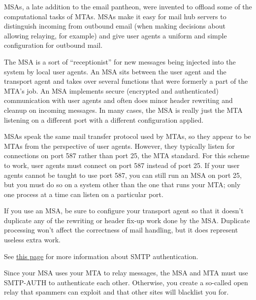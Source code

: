 \protect\hypertarget{part0026_split_003.htmlux5cux23_idIndexMarker2403}{}{}\protect\hypertarget{part0026_split_003.htmlux5cux23_idIndexMarker2404}{}{}\protect\hypertarget{part0026_split_003.htmlux5cux23_idIndexMarker2405}{}{}MSAs,
a late addition to the email pantheon, were invented to offload some of
the computational tasks of MTAs. MSAs make it easy for mail hub servers
to distinguish incoming from outbound email (when making decisions about
allowing relaying, for example) and give user agents a uniform and
simple configuration for outbound mail.

The MSA is a sort of ``receptionist'' for new messages being injected
into the system by local user agents. An MSA sits between the user agent
and the transport agent and takes over several functions that were
formerly a part of the MTA's job. An MSA implements secure (encrypted
and authenticated) communication with user agents and often does minor
header rewriting and cleanup on incoming messages. In many cases, the
MSA is really just the MTA listening on a different port with a
different configuration applied.

MSAs speak the same mail transfer protocol used by MTAs, so they appear
to be MTAs from the perspective of user agents. However, they typically
listen for connections on port 587 rather than port 25, the MTA
standard. For this scheme to work, user agents must connect on port 587
instead of port 25. If your user agents cannot be taught to use port
587, you can still run an MSA on port 25, but you must do so on a system
other than the one that runs your MTA; only one process at a time can
listen on a particular port.

If you use an MSA, be sure to configure your transport agent so that it
doesn't duplicate any of the rewriting or header fix-up work done by the
MSA. Duplicate processing won't affect the correctness of mail handling,
but it does represent useless extra work.

\leavevmode\hypertarget{part0026_split_003.htmlux5cux23_idContainer1103}{}%
See
\protect\hyperlink{part0026_split_012.htmlux5cux23_idTextAnchor1018}{this
page} for more information about SMTP authentication.

Since your MSA uses your MTA to relay messages, the MSA and MTA must use
SMTP-AUTH to authenticate each other. Otherwise, you create a so-called
open relay that spammers can exploit and that other sites will blacklist
you for.

\protect\hypertarget{part0026_split_004.html}{}{}

